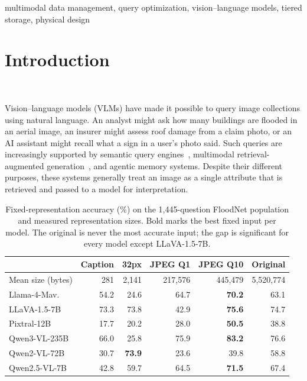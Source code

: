 \documentclass[10pt,conference]{IEEEtran}
\newcommand{\tableformat}{\footnotesize\setlength{\tabcolsep}{3pt}\renewcommand{\arraystretch}{0.95}}
\newcommand{\mLlama}{Llama-4-Mav.\xspace}
\newcommand{\mLlava}{LLaVA-1.5-7B\xspace}
\newcommand{\mPix}{Pixtral-12B\xspace}
\newcommand{\mQThree}{Qwen3-VL-235B\xspace}
\newcommand{\mQSevTwo}{Qwen2-VL-72B\xspace}
\newcommand{\mQSev}{Qwen2.5-VL-7B\xspace}
\begin{document}
\begin{IEEEkeywords}
multimodal data management, query optimization, vision--language models,
tiered storage, physical design
\end{IEEEkeywords}

\section{Introduction}~\label{sec:intro}

Vision--language models (VLMs) have made it possible to query image collections using natural language. An analyst might ask how many buildings are flooded in an aerial image, an insurer might assess roof damage from a claim photo, or an AI assistant might recall what a sign in a user's photo said. Such queries are increasingly supported by semantic query engines~\cite{patel2024lotus,liu2025palimpzest,jo2024thalamusdb,urban2024caesura}, multimodal retrieval-augmented generation~\cite{lewis2020rag,chen2022murag,yasunaga2023retrievalaugmented}, and agentic memory systems. Despite their different purposes, these systems generally treat an image as a single attribute that is retrieved and passed to a model for interpretation.

\begin{table}[htbp]
\centering
\tableformat
\caption{Fixed-representation accuracy (\%) on the 1,445-question FloodNet
population and measured representation sizes. Bold marks the best fixed
input per model. The original is never the most accurate input; the gap is
significant for every model except \mLlava.}
\label{tab:fixed}
\begin{tabular}{lrrrrr}
\toprule
 & Caption & 32px & JPEG Q1 & JPEG Q10 & Original \\
\midrule
Mean size (bytes) & 281 & 2,141 & 217,576 & 445,479 & 5,520,774 \\
\midrule
\mLlama   & 54.2 & 24.6 & 64.7 & \textbf{70.2} & 63.1 \\
\mLlava   & 73.3 & 73.8 & 42.9 & \textbf{75.6} & 74.7 \\
\mPix     & 17.7 & 20.2 & 28.0 & \textbf{50.5} & 38.8 \\
\mQThree  & 66.0 & 25.8 & 75.9 & \textbf{83.2} & 76.6 \\
\mQSevTwo & 30.7 & \textbf{73.9} & 23.6 & 39.8 & 58.8 \\
\mQSev    & 42.8 & 59.7 & 64.5 & \textbf{71.5} & 67.4 \\
\bottomrule
\end{tabular}
\end{table}
\end{document}
